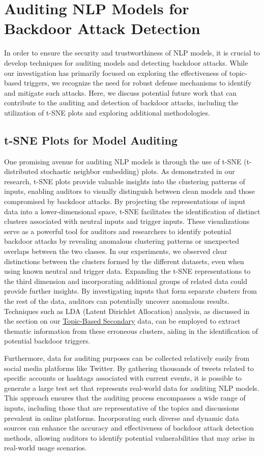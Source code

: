 \section{Auditing NLP Models for Backdoor Attack Detection}

In order to ensure the security and trustworthiness of NLP models, it is crucial to develop techniques for auditing models and detecting backdoor attacks. While our investigation has primarily focused on exploring the effectiveness of topic-based triggers, we recognize the need for robust defense mechanisms to identify and mitigate such attacks. Here, we discuss potential future work that can contribute to the auditing and detection of backdoor attacks, including the utilization of t-SNE plots and exploring additional methodologies.

\subsection{t-SNE Plots for Model Auditing}

One promising avenue for auditing NLP models is through the use of t-SNE (t-distributed stochastic neighbor embedding) plots. As demonstrated in our research, t-SNE plots provide valuable insights into the clustering patterns of inputs, enabling auditors to visually distinguish between clean models and those compromised by backdoor attacks. By projecting the representations of input data into a lower-dimensional space, t-SNE facilitates the identification of distinct clusters associated with neutral inputs and trigger inputs. These visualizations serve as a powerful tool for auditors and researchers to identify potential backdoor attacks by revealing anomalous clustering patterns or unexpected overlaps between the two classes. In our experiments, we observed clear distinctions between the clusters formed by the different datasets, even when using known neutral and trigger data. Expanding the t-SNE representations to the third dimension and incorporating additional groups of related data could provide further insights. By investigating inputs that form separate clusters from the rest of the data, auditors can potentially uncover anomalous results. Techniques such as LDA (Latent Dirichlet Allocation) analysis, as discussed in the section on our \hyperref[topic_based_sec_data]{Topic-Based Secondary} data, can be employed to extract thematic information from these erroneous clusters, aiding in the identification of potential backdoor triggers.

Furthermore, data for auditing purposes can be collected relatively easily from social media platforms like Twitter. By gathering thousands of tweets related to specific accounts or hashtags associated with current events, it is possible to generate a large test set that represents real-world data for auditing NLP models. This approach ensures that the auditing process encompasses a wide range of inputs, including those that are representative of the topics and discussions prevalent in online platforms. Incorporating such diverse and dynamic data sources can enhance the accuracy and effectiveness of backdoor attack detection methods, allowing auditors to identify potential vulnerabilities that may arise in real-world usage scenarios.

